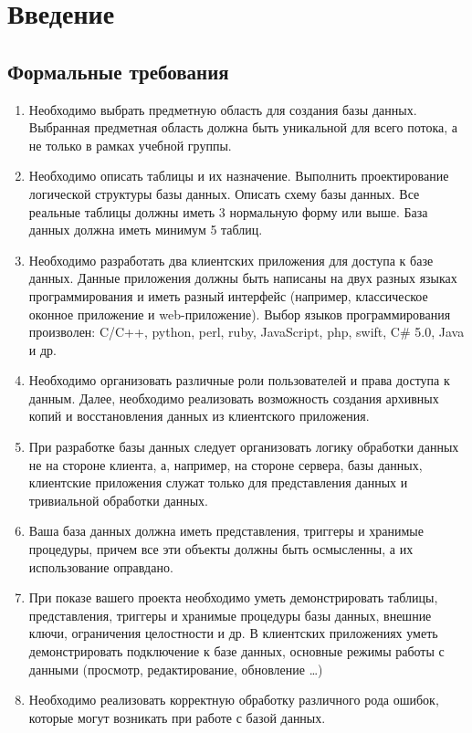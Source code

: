 \section{Введение}

\subsection{Формальные требования}
\begin{enumerate}
    \item Необходимо выбрать предметную область для создания базы данных. Выбранная предметная область должна быть уникальной для всего потока, а не только в рамках учебной группы.
    \item Необходимо описать таблицы и их назначение. Выполнить проектирование логической структуры базы данных. Описать схему базы данных. Все реальные таблицы должны иметь 3 нормальную форму или выше. База данных должна иметь минимум 5 таблиц.
    \item Необходимо разработать два клиентских приложения для доступа к базе данных. Данные приложения должны быть написаны на двух разных языках программирования и иметь разный интерфейс (например, классическое оконное приложение и web-приложение). Выбор языков программирования произволен: C/C++, python, perl, ruby, JavaScript, php, swift, C\# 5.0, Java и др.
    \item Необходимо организовать различные роли пользователей и права доступа к данным. Далее, необходимо реализовать возможность создания архивных копий и восстановления данных из клиентского приложения.
    \item При разработке базы данных следует организовать логику обработки данных не на стороне клиента, а, например, на стороне сервера, базы данных, клиентские приложения служат только для представления данных и тривиальной обработки данных.
    \item Ваша база данных должна иметь представления, триггеры и хранимые процедуры, причем все эти объекты должны быть осмысленны, а их использование оправдано.
    \item При показе вашего проекта необходимо уметь демонстрировать таблицы, представления, триггеры и хранимые процедуры базы данных, внешние ключи, ограничения целостности и др. В клиентских приложениях уметь демонстрировать подключение к базе данных, основные режимы работы с данными (просмотр, редактирование, обновление \dots)
    \item Необходимо реализовать корректную обработку различного рода ошибок, которые могут возникать при работе с базой данных.
\end{enumerate}

